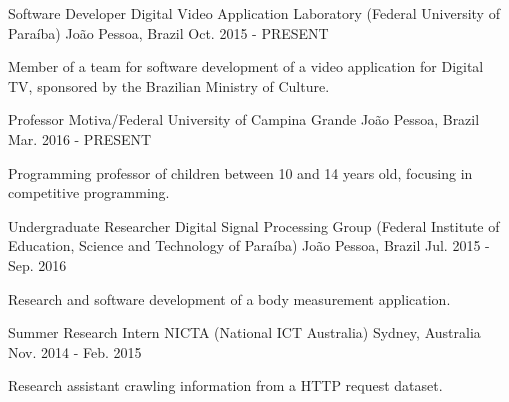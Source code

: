 

\begin{cventries}

  \cventry
    {Software Developer} %
    {Digital Video Application Laboratory (Federal University of Paraíba)} %
    {João Pessoa, Brazil} %
    {Oct. 2015 - PRESENT} %
    {
      \begin{cvitems} %
        \item {Member of a team for software development of a video application for Digital TV, sponsored by the Brazilian Ministry of Culture.}
      \end{cvitems}
    }
  \cventry
    {Professor} %
    {Motiva/Federal University of Campina Grande} %
    {João Pessoa, Brazil} %
    {Mar. 2016 - PRESENT} %
    {
      \begin{cvitems} %
        \item {Programming professor of children between 10 and 14 years old, focusing in competitive programming.}
      \end{cvitems}
    }
  \cventry
    {Undergraduate Researcher} %
    {Digital Signal Processing Group (Federal Institute of Education, Science and Technology of Paraíba)} %
    {João Pessoa, Brazil} %
    {Jul. 2015 - Sep. 2016} %
    {
      \begin{cvitems} %
	    \item {Research and software development of a body measurement application.}
      \end{cvitems}
    }

  \cventry
    {Summer Research Intern} %
    {NICTA (National ICT Australia)} %
    {Sydney, Australia} %
    {Nov. 2014 - Feb. 2015} %
    {
      \begin{cvitems} %
        \item {Research assistant crawling information from a HTTP request dataset.}
      \end{cvitems}
    }


\end{cventries}
